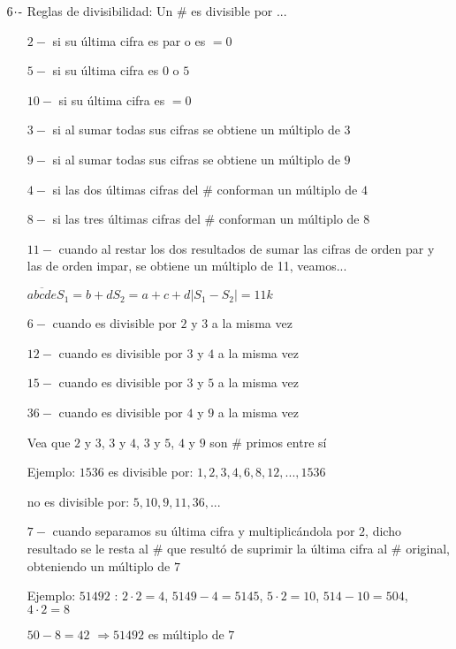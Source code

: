 $6\hspace{-0.05cm}\cdot\hspace{-0.05cm}\text{-}$ Reglas de divisibilidad: Un \# es divisible por ...
\begin{itemize}
    \addtolength{\itemindent}{1cm}
    \item[$2 -$] si su última cifra es par o es $= 0$
    \item[$5 -$] si su última cifra es $0$ o $5$
    \item[$10 -$] si su última cifra es $= 0$
    \item[$3 -$] si al sumar todas sus cifras se obtiene un múltiplo de $3$
    \item[$9 -$] si al sumar todas sus cifras se obtiene un múltiplo de $9$
    \item[$4 -$] si las dos últimas cifras del \# conforman un múltiplo de $4$
    \item[$8 -$] si las tres últimas cifras del \# conforman un múltiplo de $8$
    \item[$11 -$] cuando al restar los dos resultados de sumar las cifras de orden par y las de orden impar, se obtiene un múltiplo de 11, veamos... \vspace{-0.3cm}
    \item[] $\overline{abcde}$\hspace{.65cm}$S_1=b+d$\hspace{.65cm}$S_2=a+c+d$\hspace{.65cm}$|S_1 - S_2| = 11k$
    \item[$6 -$] cuando es divisible por $2$ y $3$ a la misma vez
    \item[$12 -$] cuando es divisible por $3$ y $4$ a la misma vez
    \item[$15 -$] cuando es divisible por $3$ y $5$ a la misma vez
    \item[$36 -$] cuando es divisible por $4$ y $9$ a la misma vez
    \item[] Vea que $2$ y $3$, $3$ y $4$, $3$ y $5$, $4$ y $9$ son \# primos entre sí\vspace{-0.3cm}
    \item[] Ejemplo: $1536$ es divisible por: $1,2,3,4,6,8,12,...,1536$ \vspace{-0.3cm}
    \item[]\hspace{2.5cm}no es divisible por: $5,10,9,11,36,...$
    \item[$7 -$] cuando separamos su última cifra y multiplicándola por $2$, dicho resultado se le resta al \# que resultó de suprimir la última cifra al \# original, obteniendo un múltiplo de $7$\vspace{-0.3cm}
    \item[] Ejemplo: $51492$ : $2\cdot2=4$, $5149-4=5145$, $5\cdot2=10$, $514-10=504$, $4\cdot2=8$\vspace{-0.3cm}
    \item[] $50-8=42$ $\Longrightarrow 51492$ es múltiplo de $7$
\end{itemize}

